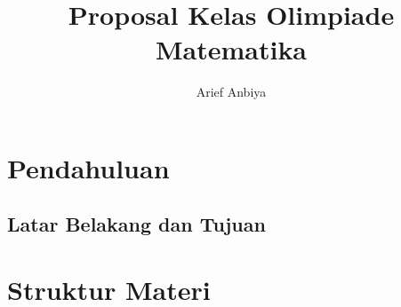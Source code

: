 \documentclass{article}
\begin{document}
\title{Proposal Kelas Olimpiade Matematika}
\author{Arief Anbiya}
\maketitle

\section{Pendahuluan}

\subsection{Latar Belakang dan Tujuan}

\section{Struktur Materi}
\end{document}
